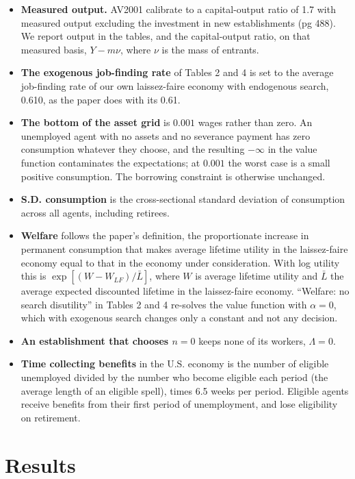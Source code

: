 \documentclass[11pt,fleqn]{article}
\begin{document}
\begin{itemize}
\item \textbf{Measured output.} AV2001 calibrate to a capital-output ratio of 1.7 with measured output excluding the investment in new establishments (pg 488). We report output in the tables, and the capital-output ratio, on that measured basis, $Y-m\nu$, where $\nu$ is the mass of entrants.
\item \textbf{The exogenous job-finding rate} of Tables 2 and 4 is set to the average job-finding rate of our own laissez-faire economy with endogenous search, 0.610, as the paper does with its 0.61.
\item \textbf{The bottom of the asset grid} is $0.001$ wages rather than zero. An unemployed agent with no assets and no severance payment has zero consumption whatever they choose, and the resulting $-\infty$ in the value function contaminates the expectations; at $0.001$ the worst case is a small positive consumption. The borrowing constraint is otherwise unchanged.
\item \textbf{S.D. consumption} is the cross-sectional standard deviation of consumption across all agents, including retirees.
\item \textbf{Welfare} follows the paper's definition, the proportionate increase in permanent consumption that makes average lifetime utility in the laissez-faire economy equal to that in the economy under consideration. With log utility this is $\exp[(W-W_{LF})/\bar{L}]$, where $W$ is average lifetime utility and $\bar{L}$ the average expected discounted lifetime in the laissez-faire economy. ``Welfare: no search disutility'' in Tables 2 and 4 re-solves the value function with $\alpha=0$, which with exogenous search changes only a constant and not any decision.
\item \textbf{An establishment that chooses $n=0$} keeps none of its workers, $\Lambda=0$.
\item \textbf{Time collecting benefits} in the U.S. economy is the number of eligible unemployed divided by the number who become eligible each period (the average length of an eligible spell), times 6.5 weeks per period. Eligible agents receive benefits from their first period of unemployment, and lose eligibility on retirement.
\end{itemize}


\section{Results}
\label{sec:results}
\end{document}
